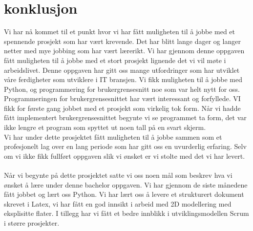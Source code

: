 \chapter{konklusjon}
\label{chap:conclusion}

Vi har nå kommet til et punkt hvor vi har fått muligheten til å jobbe med et spennende prosjekt som har vært krevende. Det har blitt lange dager og langer netter med mye jobbing som har vært lærerikt. Vi har gjennom denne oppgaven fått muligheten til å jobbe med et stort prosjekt lignende det vi vil møte i arbeidslivet. Denne oppgaven har gitt oss mange utfordringer som har utviklet våre ferdigheter som utviklere i IT bransjen. Vi fikk muligheten til å jobbe med Python, og programmering for brukergrensesnitt noe som var helt nytt for oss. Programmeringen for brukergrensesnittet har vært interessant og forfyllede. VI fikk for første gang jobbet med et prosjekt som virkelig tok form. Når vi hadde fått implementert brukergrensesnittet begynte vi se programmet ta form, det var ikke lengre et program som spyttet ut noen tall på en svart skjerm.\\
Vi har under dette prosjektet fått muligheten til å jobbe sammen som et profesjonelt lag over en lang periode som har gitt oss en uvurderlig erfaring. Selv om vi ikke fikk fullført oppgaven slik vi ønsket er vi stolte med det vi har levert.\\ \\
Når vi begynte på dette prosjektet satte vi oss noen mål som beskrev hva vi ønsket å lære under denne bachelor oppgaven. Vi har gjennom de siste månedene fått jobbet og lært oss Python. Vi har lært oss å levere et strukturert dokument skrevet i Latex, vi har fått en god innsikt i arbeid med 2D modellering med eksplisitte flater. I tillegg har vi fått et bedre innblikk i utviklingsmodellen Scrum i større prosjekter.